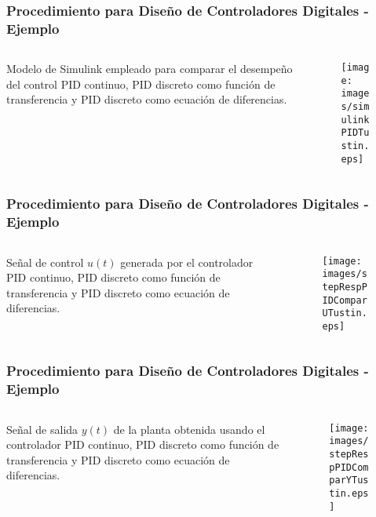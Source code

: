 \documentclass[aspectratio=169,handout]{beamer}
\theoremstyle{definition}
\theoremstyle{plain}
\theoremstyle{remark}
\begin{document}
\begin{frame}[c]\frametitle{Procedimiento para Diseño de Controladores Digitales - Ejemplo}
\begin{columns}
	\begin{column}{0.3\textwidth}
		Modelo de Simulink empleado para comparar el desempeño del control PID continuo, PID discreto como función de transferencia y PID discreto como ecuación de diferencias.
	\end{column}
	\begin{column}{0.7\textwidth}
		\begin{figure}
			\centering
			\texttt{[image: images/simulinkPIDTustin.eps]}
		\end{figure}
	\end{column}
\end{columns}
\end{frame}

\begin{frame}[c]\frametitle{Procedimiento para Diseño de Controladores Digitales - Ejemplo}
\begin{columns}
	\begin{column}{0.3\textwidth}
		Señal de control $u(t)$ generada por el controlador PID continuo, PID discreto como función de transferencia y PID discreto como ecuación de diferencias.
	\end{column}
	\begin{column}{0.7\textwidth}
		\begin{figure}
			\centering
			\texttt{[image: images/stepRespPIDComparUTustin.eps]}
		\end{figure}
	\end{column}
\end{columns}
\end{frame}
 
\begin{frame}[c]\frametitle{Procedimiento para Diseño de Controladores Digitales - Ejemplo}
\begin{columns}
	\begin{column}{0.3\textwidth}
		Señal de salida $y(t)$ de la planta obtenida usando el controlador PID continuo, PID discreto como función de transferencia y PID discreto como ecuación de diferencias.
	\end{column}
	\begin{column}{0.7\textwidth}
		\begin{figure}
			\centering
			\texttt{[image: images/stepRespPIDComparYTustin.eps]}
		\end{figure}
	\end{column}
\end{columns}
\end{frame}
\end{document}
